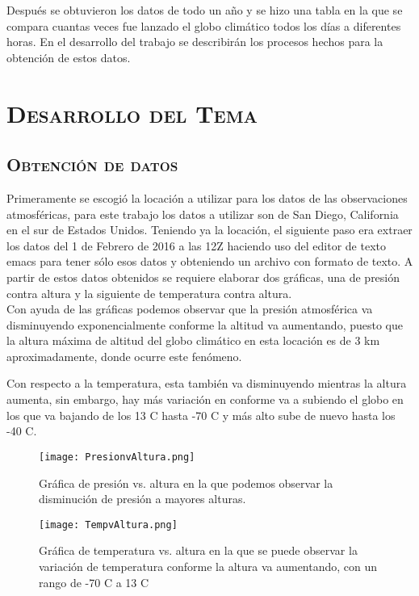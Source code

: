\documentclass[12pt]{article}
\begin{document}
Después se obtuvieron los datos de todo un año y se hizo una tabla en la que se compara cuantas veces fue lanzado el globo climático todos los días a diferentes horas. En el desarrollo del trabajo se describirán los procesos hechos para la obtención de estos datos.

\pagebreak
\section{\textsc{Desarrollo del Tema}}
\subsection{\textsc{Obtención de datos}}
Primeramente se escogió la locación a utilizar para los datos de las observaciones atmosféricas, para este trabajo los datos a utilizar son de San Diego, California en el sur de Estados Unidos. Teniendo ya la locación, el siguiente paso era extraer los datos del 1 de Febrero de 2016 a las 12Z haciendo uso del editor de texto emacs para tener sólo esos datos y obteniendo un archivo con formato de texto. A partir de estos datos obtenidos se requiere elaborar dos gráficas, una de presión contra altura y la siguiente de temperatura contra altura. \\

Con ayuda de las gráficas podemos observar que la presión atmosférica va disminuyendo exponencialmente conforme la altitud va aumentando, puesto que la altura máxima de altitud del globo climático en esta locación es de 3 km aproximadamente, donde ocurre este fenómeno.

Con respecto a la temperatura, esta también va disminuyendo mientras la altura aumenta, sin embargo, hay más variación en conforme va a subiendo el globo en los que va bajando de los 13 C hasta -70 C y más alto sube de nuevo hasta los -40 C.

\begin{figure}
\centering
\texttt{[image: PresionvAltura.png]}
\caption{Gráfica de presión vs. altura en la que podemos observar la disminución de presión a mayores alturas.}
\end{figure}

\begin{figure}
\centering
\texttt{[image: TempvAltura.png]}
\caption{Gráfica de temperatura vs. altura en la que se puede observar la variación de temperatura conforme la altura va aumentando, con un rango de -70 C a 13 C}
\end{figure}
\pagebreak
\end{document}
